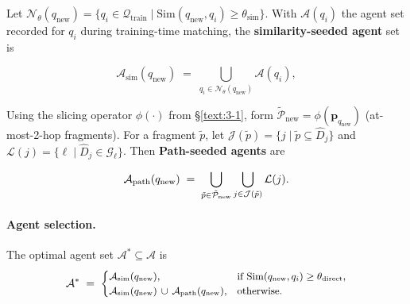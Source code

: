 \documentclass[sigconf]{acmart}
\begin{document}
Let \(\mathcal{N}_\theta(q_{\text{new}}) = \{q_i \in \mathcal{Q}_{\text{train}} \mid \text{Sim}(q_{\text{new}},q_i)\ge \theta_{\text{sim}}\}\).
With \(\mathcal{A}(q_i)\) the agent set recorded for \(q_i\) during training-time matching, the \textbf{similarity-seeded agent} set is

\begin{equation}
\label{eq:asim}
\mathcal{A}_{\text{sim}}(q_{\text{new}})
\;=\;
\bigcup_{q_i \in \mathcal{N}_\theta(q_{\text{new}})} \mathcal{A}(q_i),
\end{equation}

Using the slicing operator \(\phi(\cdot)\) from \S\ref{text:3-1}, form
\(\tilde{\mathcal{P}}_{\text{new}}=\phi(\mathbf{p}_{q_{\text{new}}})\) (at-most-2-hop fragments).
For a fragment \(\tilde{p}\), let
\(\mathcal{J}(\tilde{p})=\{j \mid \tilde{p}\subseteq \hat{D}_j\}\) and
\(\mathcal{L}(j)=\{\ell \mid \hat{D}_j\in\mathcal{G}_\ell\}\).
Then \textbf{Path-seeded agents} are

\begin{equation}
\small
\label{eq:apath}
\mathcal{A}_{\text{path}}(q_{\text{new}})
\;=\;
\bigcup_{\tilde{p}\in \tilde{\mathcal{P}}_{\text{new}}}
\bigcup_{j \in \mathcal{J}(\tilde{p})}
\mathcal{L}(j).
\end{equation}

\paragraph{Agent selection.}
The optimal agent set $\mathcal{A}^* \subseteq\mathcal{A}$ is
\begin{equation}
\small
\label{eq:agent-select}
\mathcal{A}^*
\;=\;
\begin{cases}
\mathcal{A}_{\text{sim}}(q_{\text{new}}), & \text{if } \text{Sim}(q_{\text{new}},q_i)\ge \theta_{\text{direct}},\\
\mathcal{A}_{\text{sim}}(q_{\text{new}})\,\cup\,\mathcal{A}_{\text{path}}(q_{\text{new}}), & \text{otherwise.}
\end{cases}
\end{equation}

\end{document}
